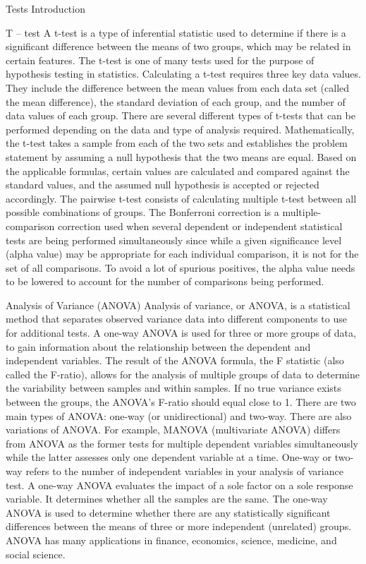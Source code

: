 \documentclass[
  ignorenonframetext,
]{beamer}
\begin{document}
\begin{frame}{Tests Introduction}
\begin{block}{T -- test}
\protect\hypertarget{t-test}{}
A t-test is a type of inferential statistic used to determine if there
is a significant difference between the means of two groups, which may
be related in certain features. The t-test is one of many tests used for
the purpose of hypothesis testing in statistics. Calculating a t-test
requires three key data values. They include the difference between the
mean values from each data set (called the mean difference), the
standard deviation of each group, and the number of data values of each
group. There are several different types of t-tests that can be
performed depending on the data and type of analysis required.
Mathematically, the t-test takes a sample from each of the two sets and
establishes the problem statement by assuming a null hypothesis that the
two means are equal. Based on the applicable formulas, certain values
are calculated and compared against the standard values, and the assumed
null hypothesis is accepted or rejected accordingly. The pairwise t-test
consists of calculating multiple t-test between all possible
combinations of groups. The Bonferroni correction is a
multiple-comparison correction used when several dependent or
independent statistical tests are being performed simultaneously since
while a given significance level (alpha value) may be appropriate for
each individual comparison, it is not for the set of all comparisons. To
avoid a lot of spurious positives, the alpha value needs to be lowered
to account for the number of comparisons being performed.
\end{block}

\begin{block}{Analysis of Variance (ANOVA)}
\protect\hypertarget{analysis-of-variance-anova}{}
Analysis of variance, or ANOVA, is a statistical method that separates
observed variance data into different components to use for additional
tests. A one-way ANOVA is used for three or more groups of data, to gain
information about the relationship between the dependent and independent
variables. The result of the ANOVA formula, the F statistic (also called
the F-ratio), allows for the analysis of multiple groups of data to
determine the variability between samples and within samples. If no true
variance exists between the groups, the ANOVA's F-ratio should equal
close to 1. There are two main types of ANOVA: one-way (or
unidirectional) and two-way. There are also variations of ANOVA. For
example, MANOVA (multivariate ANOVA) differs from ANOVA as the former
tests for multiple dependent variables simultaneously while the latter
assesses only one dependent variable at a time. One-way or two-way
refers to the number of independent variables in your analysis of
variance test. A one-way ANOVA evaluates the impact of a sole factor on
a sole response variable. It determines whether all the samples are the
same. The one-way ANOVA is used to determine whether there are any
statistically significant differences between the means of three or more
independent (unrelated) groups. ANOVA has many applications in finance,
economics, science, medicine, and social science.
\end{block}


\end{frame}
\end{document}
